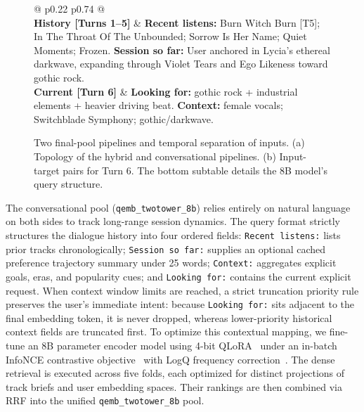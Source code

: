 \begin{figure}[t]
  \begin{tabular*}{\linewidth}{@{\extracolsep{\fill}} p{0.22\linewidth} p{0.74\linewidth} @{}}
    \toprule
     \\
    \midrule
    \textbf{History [Turns 1--5]} & 
    \textbf{Recent listens:} Burn Witch Burn [T5]; In The Throat Of The Unbounded; Sorrow Is Her Name; Quiet Moments; Frozen. \newline
    \textbf{Session so far:} User anchored in Lycia's ethereal darkwave, expanding through Violet Tears and Ego Likeness toward gothic rock. \\
    \midrule
    \textbf{Current [Turn 6]} & 
    \textbf{Looking for:} gothic rock + industrial elements + heavier driving beat. \newline
    \textbf{Context:} female vocals; Switchblade Symphony; gothic/darkwave. \\
    \bottomrule
  \end{tabular*}
  \vspace{-3mm}
  \caption{Two final-pool pipelines and temporal separation of inputs. (a) Topology of the hybrid and conversational pipelines. (b) Input-target pairs for Turn 6. The bottom subtable details the 8B model's query structure.}
  \label{fig:textviews}
  \vspace{-2mm}
\end{figure}

The conversational pool (\texttt{qemb\_twotower\_8b}) relies entirely on natural language on both sides to track long-range session dynamics. The query format strictly structures the dialogue history into four ordered fields: \texttt{Recent listens:} lists prior tracks chronologically; \texttt{Session so far:} supplies an optional cached preference trajectory summary under 25 words; \texttt{Context:} aggregates explicit goals, eras, and popularity cues; and \texttt{Looking for:} contains the current explicit request. When context window limits are reached, a strict truncation priority rule preserves the user's immediate intent: because \texttt{Looking for:} sits adjacent to the final embedding token, it is never dropped, whereas lower-priority historical context fields are truncated first. To optimize this contextual mapping, we fine-tune an 8B parameter encoder model using 4-bit QLoRA~\cite{dettmers2023qlora} under an in-batch InfoNCE contrastive objective~\cite{oord2018cpc} with LogQ frequency correction~\cite{yi2019sampling}. The dense retrieval is executed across five folds, each optimized for distinct projections of track briefs and user embedding spaces. Their rankings are then combined via RRF into the unified \texttt{qemb\_twotower\_8b} pool.


